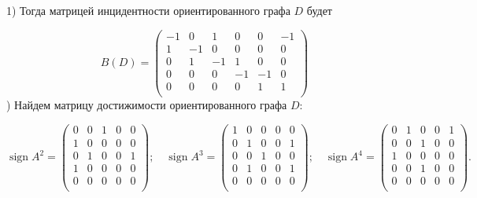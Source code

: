 \documentclass[fleqn]{article}
\DeclareMathOperator{\sign}{sign}
\begin{document}
1) Тогда матрицей инцидентности ориентированного графа $D$ будет

$$B(D)=
\begin{pmatrix}
-1 & 0 & 1 & 0 & 0 & -1 \\
1 & -1 & 0 & 0 & 0 & 0 \\
0 & 1 & -1 & 1 & 0 & 0 \\
0 & 0 & 0 & -1 & -1 & 0 \\
0 & 0 & 0 & 0 & 1 & 1 \\
\end{pmatrix}
$$
) Найдем матрицу достижимости ориентированного графа $D$:

$$
\sign{A^2} = \begin{pmatrix}
0 & 0 & 1 & 0 & 0 \\
1 & 0 & 0 & 0 & 0 \\
0 & 1 & 0 & 0 & 1 \\
1 & 0 & 0 & 0 & 0 \\
0 & 0 & 0 & 0 & 0 \\
\end{pmatrix}
;\quad
\sign{A^3} = \begin{pmatrix}
1 & 0 & 0 & 0 & 0 \\
0 & 1 & 0 & 0 & 1 \\
0 & 0 & 1 & 0 & 0 \\
0 & 1 & 0 & 0 & 1 \\
0 & 0 & 0 & 0 & 0 \\
\end{pmatrix}
;\quad
\sign{A^4} = \begin{pmatrix}
0 & 1 & 0 & 0 & 1 \\
0 & 0 & 1 & 0 & 0 \\
1 & 0 & 0 & 0 & 0 \\
0 & 0 & 1 & 0 & 0 \\
0 & 0 & 0 & 0 & 0 \\
\end{pmatrix}.
$$
\end{document}
